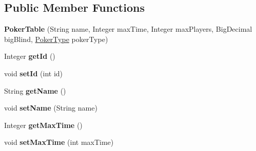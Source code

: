 \subsection*{Public Member Functions}
\begin{DoxyCompactItemize}
\item 
\hypertarget{classhu_1_1elte_1_1bfw1p6_1_1poker_1_1model_1_1entity_1_1_poker_table_a79edfe22e7547fed43869a01f155af85}{}{\bfseries Poker\+Table} (String name, Integer max\+Time, Integer max\+Players, Big\+Decimal big\+Blind, \hyperlink{enumhu_1_1elte_1_1bfw1p6_1_1poker_1_1model_1_1entity_1_1_poker_type}{Poker\+Type} poker\+Type)\label{classhu_1_1elte_1_1bfw1p6_1_1poker_1_1model_1_1entity_1_1_poker_table_a79edfe22e7547fed43869a01f155af85}

\item 
\hypertarget{classhu_1_1elte_1_1bfw1p6_1_1poker_1_1model_1_1entity_1_1_poker_table_a562ded3d08069198b2409365dfc8a9e3}{}Integer {\bfseries get\+Id} ()\label{classhu_1_1elte_1_1bfw1p6_1_1poker_1_1model_1_1entity_1_1_poker_table_a562ded3d08069198b2409365dfc8a9e3}

\item 
\hypertarget{classhu_1_1elte_1_1bfw1p6_1_1poker_1_1model_1_1entity_1_1_poker_table_ac6540af4094204111be313aad4cb32c0}{}void {\bfseries set\+Id} (int id)\label{classhu_1_1elte_1_1bfw1p6_1_1poker_1_1model_1_1entity_1_1_poker_table_ac6540af4094204111be313aad4cb32c0}

\item 
\hypertarget{classhu_1_1elte_1_1bfw1p6_1_1poker_1_1model_1_1entity_1_1_poker_table_aff6d68d58d57df76f1c4c3c1e6cecd29}{}String {\bfseries get\+Name} ()\label{classhu_1_1elte_1_1bfw1p6_1_1poker_1_1model_1_1entity_1_1_poker_table_aff6d68d58d57df76f1c4c3c1e6cecd29}

\item 
\hypertarget{classhu_1_1elte_1_1bfw1p6_1_1poker_1_1model_1_1entity_1_1_poker_table_a6b365bff8ab506ed5c57a09efebd029f}{}void {\bfseries set\+Name} (String name)\label{classhu_1_1elte_1_1bfw1p6_1_1poker_1_1model_1_1entity_1_1_poker_table_a6b365bff8ab506ed5c57a09efebd029f}

\item 
\hypertarget{classhu_1_1elte_1_1bfw1p6_1_1poker_1_1model_1_1entity_1_1_poker_table_a05a77438b4362ce1eb4af6dd6ba238b8}{}Integer {\bfseries get\+Max\+Time} ()\label{classhu_1_1elte_1_1bfw1p6_1_1poker_1_1model_1_1entity_1_1_poker_table_a05a77438b4362ce1eb4af6dd6ba238b8}

\item 
\hypertarget{classhu_1_1elte_1_1bfw1p6_1_1poker_1_1model_1_1entity_1_1_poker_table_a75eb4b1c46ddd7cfc13333641bc55cd8}{}void {\bfseries set\+Max\+Time} (int max\+Time)\label{classhu_1_1elte_1_1bfw1p6_1_1poker_1_1model_1_1entity_1_1_poker_table_a75eb4b1c46ddd7cfc13333641bc55cd8}


\end{DoxyCompactItemize}
